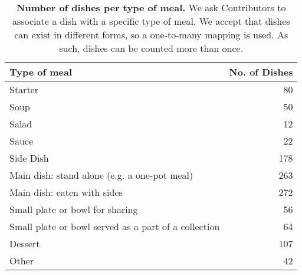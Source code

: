 \begin{table}[h]
\centering
\caption{\small \textbf{Number of dishes per type of meal.} We ask Contributors to associate a dish with a specific type of meal. We accept that dishes can exist in different forms, so a one-to-many mapping is used. As such, dishes can be counted more than once.}
\label{tab:type_meal_tally}
\begin{tabular}{lr} 
\\
\toprule
\textbf{Type of meal}& \textbf{No. of Dishes}   \\ 
\midrule
Starter  & 80   \\
Soup & 50     \\
Salad & 12   \\
Sauce  &  22  \\
Side Dish  & 178  \\
Main dish: stand alone (e.g. a one-pot meal)  &  263 \\
Main dish: eaten with sides  &  272 \\
Small plate or bowl for sharing  &  56\\
Small plate or bowl served as a part of a collection  &  64\\
Dessert  &  107 \\
Other &  42 \\

\bottomrule

\end{tabular}
\end{table}